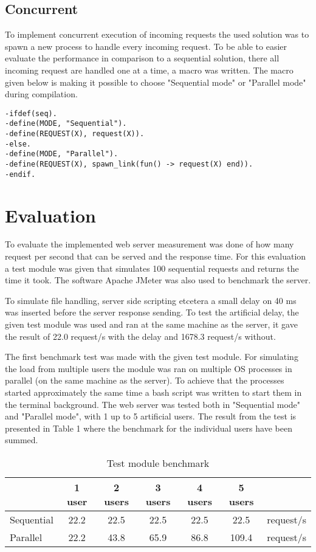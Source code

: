 \documentclass[a4paper, 11pt]{article}
\begin{document}
\subsection{Concurrent}
To implement concurrent execution of incoming requests the used solution was to spawn a new process to handle every incoming request. To be able to easier evaluate the performance in comparison to a sequential  solution, there all incoming request are handled one at a time, a macro was written. The macro given below is making it possible to choose "Sequential mode" or "Parallel mode" during compilation.

\begin{verbatim}
-ifdef(seq).
-define(MODE, "Sequential").
-define(REQUEST(X), request(X)).
-else.
-define(MODE, "Parallel").
-define(REQUEST(X), spawn_link(fun() -> request(X) end)).
-endif.
\end{verbatim}

\section{Evaluation}

To evaluate the implemented web server measurement was done of how many request per second that can be served and the response time. For this evaluation a test module was given that simulates 100 sequential requests and returns the time it took. The software Apache JMeter was also used to benchmark the server.

To simulate file handling, server side scripting etcetera a small delay on 40 ms was inserted before the server response sending. To test the artificial delay, the given test module was used and ran at the same machine as the server, it gave the result of 22.0 request/s with the delay and 1678.3 request/s without.

The first benchmark test was made with the given test module. For simulating the load from multiple users the module was ran on multiple OS processes in parallel (on the same machine as the server). To achieve that the processes started approximately the same time a bash script was written to start them in the terminal background. The web server was tested both in "Sequential mode" and "Parallel mode", with 1 up to 5 artificial users. The result from the test is presented in Table 1 where the benchmark for the individual users have been summed.

\begin{table}[h]
\centering
\begin{tabular}{lcccccc}
& 1 user & 2 users & 3 users & 4 users & 5 users &\\
\hline
Sequential & 22.2 & 22.5 & 22.5 & 22.5 & 22.5 & request/s\\
\hline
Parallel & 22.2 & 43.8 & 65.9 & 86.8 & 109.4 & request/s\\
\hline
\end{tabular}
\caption{Test module benchmark}
\label{tab:results}
\end{table}
\end{document}
